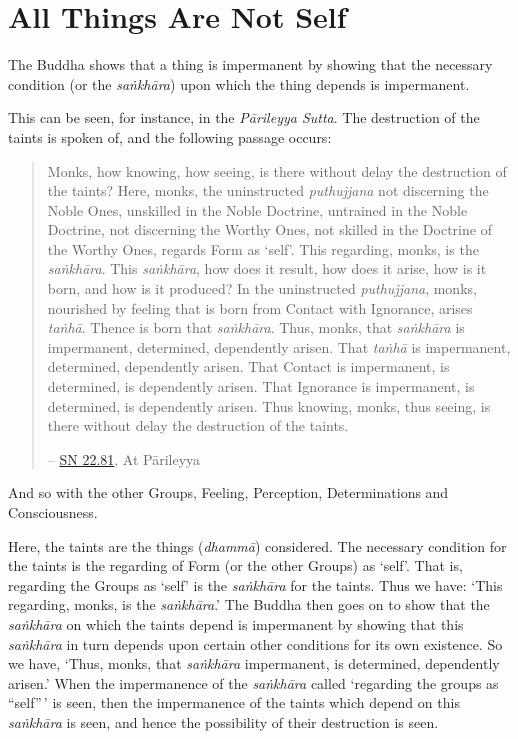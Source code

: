 \chapter{All Things Are Not Self}

The Buddha shows that a thing is impermanent by showing that the necessary condition (or the \emph{saṅkhāra}) upon which the thing depends is impermanent.

This can be seen, for instance, in the \emph{Pārileyya Sutta}. The destruction of the taints is spoken of, and the following passage occurs:

\begin{quote}
Monks, how knowing, how seeing, is there without delay the destruction of the taints? Here, monks, the uninstructed \emph{puthujjana} not discerning the Noble Ones, unskilled in the Noble Doctrine, untrained in the Noble Doctrine, not discerning the Worthy Ones, not skilled in the Doctrine of the Worthy Ones, regards Form as `self'. This regarding, monks, is the \emph{saṅkhāra}. This \emph{saṅkhāra}, how does it result, how does it arise, how is it born, and how is it produced? In the uninstructed \emph{puthujjana}, monks, nourished by feeling that is born from Contact with Ignorance, arises \emph{taṅhā}. Thence is born that \emph{saṅkhāra}. Thus, monks, that \emph{saṅkhāra} is impermanent, determined, dependently arisen. That \emph{taṅhā} is impermanent, determined, dependently arisen. That Contact is impermanent, is determined, is dependently arisen. That Ignorance is impermanent, is determined, is dependently arisen. Thus knowing, monks, thus seeing, is there without delay the destruction of the taints.

 -- \href{https://suttacentral.net/sn22.81/en/bodhi}{SN 22.81}, At Pārileyya
\end{quote}

And so with the other Groups, Feeling, Perception, Determinations and Consciousness.

Here, the taints are the things (\emph{dhammā}) considered. The necessary condition for the taints is the regarding of Form (or the other Groups) as `self'. That is, regarding the Groups as `self' is the \emph{saṅkhāra} for the taints. Thus we have: `This regarding, monks, is the \emph{saṅkhāra}.' The Buddha then goes on to show that the \emph{saṅkhāra} on which the taints depend is impermanent by showing that this \emph{saṅkhāra} in turn depends upon certain other conditions for its own existence. So we have, `Thus, monks, that \emph{saṅkhāra} impermanent, is determined, dependently arisen.' When the impermanence of the \emph{saṅkhāra} called `regarding the groups as ``self''\,' is seen, then the impermanence of the taints which depend on this \emph{saṅkhāra} is seen, and hence the possibility of their destruction is seen.

